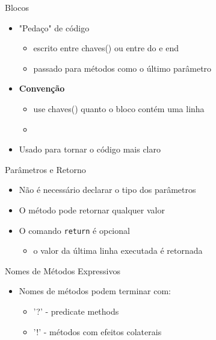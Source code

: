 
\begin{frame}[fragile,t]{Blocos}
  \begin{itemize}
    \item "Pedaço" de código
    \begin{itemize}
      \item escrito entre chaves(${}$) ou entre \alert{do} e \alert{end}
      \item passado para métodos como o \alert{último} parâmetro
    \end{itemize}
    \item \textbf{Convenção} 
    \begin{itemize}
      \item use chaves(${}$) quanto o bloco contém uma linha
      \item 
    \end{itemize}
    \item Usado para tornar o código mais claro
  \end{itemize}
  
  
    
\end{frame}

\begin{frame}[fragile,t]{Parâmetros e Retorno}
  \begin{itemize}
    \item Não é necessário declarar o tipo dos parâmetros
    \item O método pode retornar qualquer valor
    \item O comando \verb!return! é opcional
    \begin{itemize}
      \item o valor da \alert{última linha} executada é retornada 
    \end{itemize}
  \end{itemize}
  
  
    
\end{frame}

\begin{frame}[fragile,t]{Nomes de Métodos Expressivos}
  \begin{itemize}
    \item Nomes de métodos podem terminar com:
    \begin{itemize}
    	\item \alert{'?'} - predicate methods
    	\item \alert{'!'} - métodos com efeitos colaterais
    \end{itemize}
    
	
  \end{itemize}   
\end{frame}

